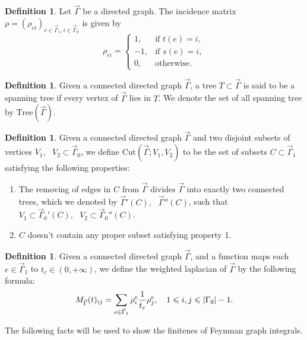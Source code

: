 \documentclass[11pt]{amsart}
\theoremstyle{definition}
\newtheorem{defn}[thm]{Definition}
\theoremstyle{remark}
\numberwithin{equation}{section}
\begin{document}
\begin{defn}
    Let $\vec{\Gamma}$ be a directed graph. The incidence matrix $\rho=(\rho_{ei})_{e\in\vec{\Gamma}_{1},i\in\vec{\Gamma}_{0}}$ is given by
    $$
    \rho_{ei}=
    \begin{cases}
        1, &\text{if }t(e)=i,\\
        -1, &\text{if }s(e)=i,\\
        0, &\text{otherwise.}
    \end{cases}
    $$
\end{defn}

\begin{defn}
  Given a connected directed graph $\vec{\Gamma}$, a tree $T \subset \vec{\Gamma}$ is
  said to be a spanning tree if every vertex of $\vec{\Gamma}$ lies in $T$. We
  denote the set of all spanning tree by $\mathrm{Tree} (\vec{\Gamma})$.
\end{defn}

\begin{defn}
  Given a connected directed graph $\vec{\Gamma}$ and two
  disjoint subsets of vertices $V_1, \text{ } V_2 \subset \vec{\Gamma}_0$, we
  define $\mathrm{Cut} (\vec{\Gamma} ; V_1, V_2)$ to be the set of subsets $C
  \subset \vec{\Gamma}_1$ satisfying the following properties:
  \begin{enumerate}
    \item The removing of edges in $C$ from $\vec{\Gamma}$ divides $\vec{\Gamma}$ into
    exactly two connected trees, which we denoted by $\vec{\Gamma}' (C), \text{ }
    \vec{\Gamma}'' (C) $, such that $V_1 \subset \vec{\Gamma}_0' (C), \text{ } V_2
    \subset \vec{\Gamma}_0'' (C)$.

    \item $C$ doesn't contain any proper subset satisfying property 1.
  \end{enumerate}
\end{defn}

\begin{defn}
  Given a connected directed graph $\vec{\Gamma}$, and a function
  maps each $e \in \vec{\Gamma}_1$ to $t_e \in (0, + \infty)$, we define the
  {{weighted laplacian}} of $\vec{\Gamma}$ by the following formula:
  \[ M_{\vec{\Gamma}} (t)_{ij} = \sum_{e \in \vec{\Gamma}_1} \rho^e_i \frac{1}{t_e}
     \rho_j^e, \text{\quad} 1 \leqslant i, j \leqslant | \Gamma_0 | - 1. \]
\end{defn}

The following facts will be used to show the finitenes of Feynman graph
integrals.
\end{document}
